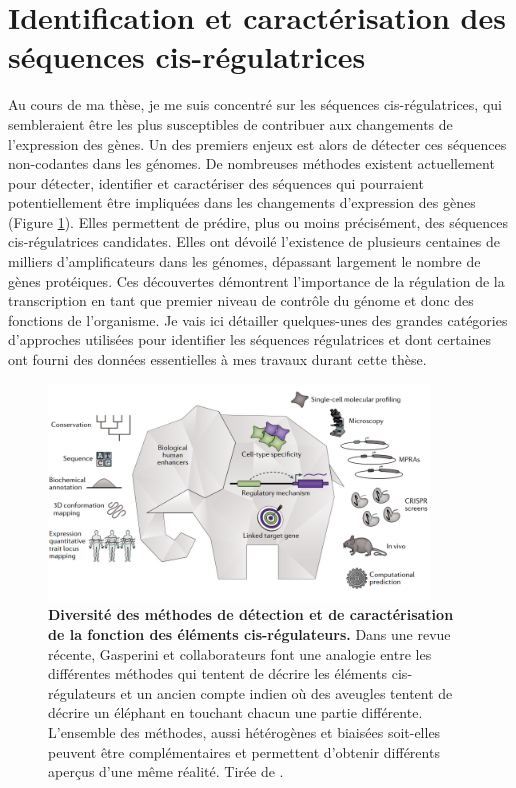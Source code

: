 \section{Identification et caractérisation des séquences \gls{cis}-régulatrices}
\label{sec:identif-cis}

Au cours de ma thèse, je me suis concentré sur les séquences \gls{cis}-régulatrices, qui sembleraient être les plus susceptibles de contribuer aux changements de l’expression des gènes. Un des premiers enjeux est alors de détecter ces séquences non-codantes dans les génomes. De nombreuses méthodes existent actuellement pour détecter, identifier et caractériser des séquences qui pourraient potentiellement être impliquées dans les changements d’expression des gènes (Figure \ref{fig:Fig7}). Elles permettent de prédire, plus ou moins précisément, des séquences \gls{cis}-régulatrices candidates. Elles ont dévoilé l’existence de plusieurs centaines de milliers d’\glspl{amplificateur} dans les génomes, dépassant largement le nombre de gènes protéiques. Ces découvertes démontrent l’importance de la régulation de la transcription en tant que premier niveau de contrôle du génome et donc des fonctions de l’organisme. Je vais ici détailler quelques-unes des grandes catégories d’approches utilisées pour identifier les séquences régulatrices et dont certaines ont fourni des données essentielles à mes travaux durant cette thèse.

\begin{figure}[h]
    \centering
    \includegraphics[width=0.9\textwidth, page=1] {figures/introduction/fig7.png}
    \caption[Diversité des méthodes de détection et de caractérisation de la fonction des éléments \gls{cis}-régulateurs.]{
    \textbf{Diversité des méthodes de détection et de caractérisation de la fonction des éléments \gls{cis}-régulateurs.}
    Dans une revue récente, Gasperini et collaborateurs font une analogie entre les différentes méthodes qui tentent de décrire les éléments \gls{cis}-régulateurs et un ancien compte indien où des aveugles tentent de décrire un éléphant en touchant chacun une partie différente. L'ensemble des méthodes, aussi hétérogènes et biaisées soit-elles peuvent être complémentaires et permettent d'obtenir différents aperçus d'une même réalité. Tirée de \citep{gasperini_towards_2020}.\\
    }
    \label{fig:Fig7}
\end{figure}

